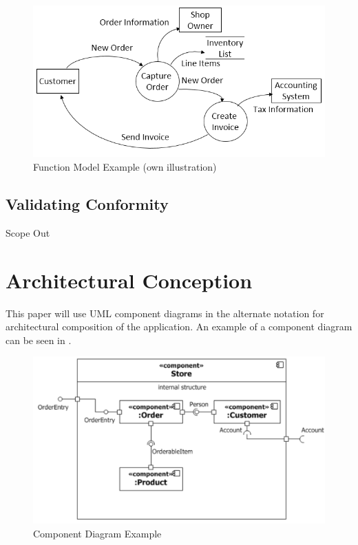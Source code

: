 \begin{figure}[H]
    \centering
    \includegraphics{img/fmEx.png}
    \caption[Function Model Example]{Function Model Example (own illustration)}
    \label{fig:fmEx}
\end{figure}


\subsection{Validating Conformity}
Scope Out

\section{Architectural Conception}
This paper will use UML component diagrams in the alternate notation \parencite[cf.][212]{ObjectManagementGroup.01.03.2015} for architectural composition of the application. An example of a component diagram can be seen in .

\begin{figure}
    \centering
    \includegraphics[width=\textwidth]{img/componentExample.pdf}
    \caption[Component Diagram Example]{Component Diagram Example \parencites[2132]{ObjectManagementGroup.01.03.2015}}
    \label{fig:comEx}
\end{figure}


